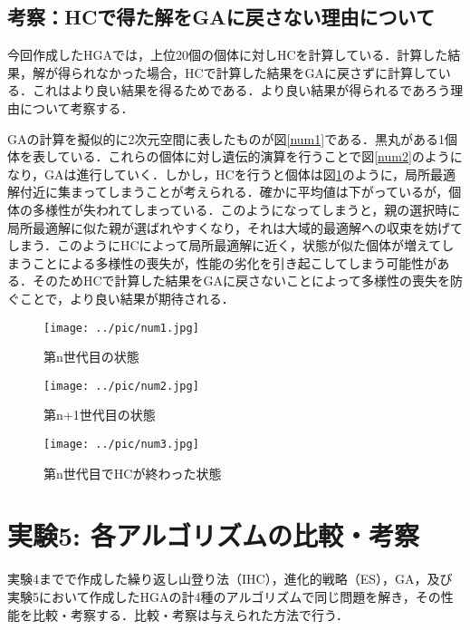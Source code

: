 \documentclass[a4j]{jarticle}
\begin{document}
\subsection{考察：HCで得た解をGAに戻さない理由について}
今回作成したHGAでは，上位20個の個体に対しHCを計算している．計算した結果，解が得られなかった場合，HCで計算した結果をGAに戻さずに計算している．これはより良い結果を得るためである．より良い結果が得られるであろう理由について考察する．\par
GAの計算を擬似的に2次元空間に表したものが図\ref{num1}である．黒丸がある1個体を表している．これらの個体に対し遺伝的演算を行うことで図\ref{num2}のようになり，GAは進行していく．しかし，HCを行うと個体は図\ref{num3}のように，局所最適解付近に集まってしまうことが考えられる．確かに平均値は下がっているが，個体の多様性が失われてしまっている．このようになってしまうと，親の選択時に局所最適解に似た親が選ばれやすくなり，それは大域的最適解への収束を妨げてしまう．このようにHCによって局所最適解に近く，状態が似た個体が増えてしまうことによる多様性の喪失が，性能の劣化を引き起こしてしまう可能性がある．そのためHCで計算した結果をGAに戻さないことによって多様性の喪失を防ぐことで，より良い結果が期待される．

\begin{figure}[hp]
 \begin{minipage}{0.33\hsize}
  \begin{center}
   \texttt{[image: ../pic/num1.jpg]}
  \end{center}
  \caption{第n世代目の状態}
  \label{num1}
 \end{minipage}
 \begin{minipage}{0.33\hsize}
  \begin{center}
   \texttt{[image: ../pic/num2.jpg]}
  \end{center}
  \caption{第n+1世代目の状態}
  \label{num2}
 \end{minipage}
 \begin{minipage}{0.33\hsize}
  \begin{center}
   \texttt{[image: ../pic/num3.jpg]}
  \end{center}
  \caption{第n世代目でHCが終わった状態}
  \label{num3}
 \end{minipage}
\end{figure}



\clearpage
\section{実験5: 各アルゴリズムの比較・考察}
実験4までで作成した繰り返し山登り法（IHC），進化的戦略（ES），GA，及び実験5において作成したHGAの計4種のアルゴリズムで同じ問題を解き，その性能を比較・考察する．比較・考察は与えられた方法で行う．
\end{document}
